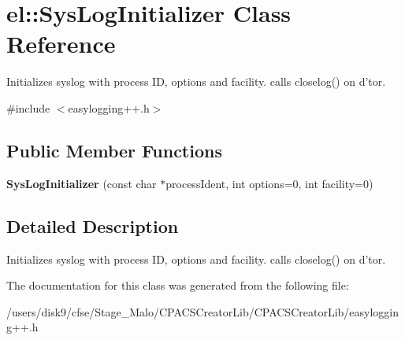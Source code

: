 \hypertarget{classel_1_1SysLogInitializer}{\section{el\-:\-:Sys\-Log\-Initializer Class Reference}
\label{classel_1_1SysLogInitializer}
}


Initializes syslog with process I\-D, options and facility. calls closelog() on d'tor.  




{\ttfamily \#include $<$easylogging++.\-h$>$}

\subsection*{Public Member Functions}
\begin{DoxyCompactItemize}
\item 
\hypertarget{classel_1_1SysLogInitializer_aae71ee83f45c4cf770fbc6c6e87d9406}{{\bfseries Sys\-Log\-Initializer} (const char $\ast$process\-Ident, int options=0, int facility=0)}\label{classel_1_1SysLogInitializer_aae71ee83f45c4cf770fbc6c6e87d9406}

\end{DoxyCompactItemize}


\subsection{Detailed Description}
Initializes syslog with process I\-D, options and facility. calls closelog() on d'tor. 

The documentation for this class was generated from the following file\-:\begin{DoxyCompactItemize}
\item 
/users/disk9/cfse/\-Stage\-\_\-\-Malo/\-C\-P\-A\-C\-S\-Creator\-Lib/\-C\-P\-A\-C\-S\-Creator\-Lib/easylogging++.\-h\end{DoxyCompactItemize}
